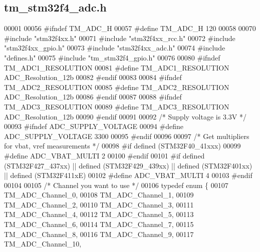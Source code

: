 \hypertarget{tm__stm32f4__adc_8h_source}{}\subsection{tm\+\_\+stm32f4\+\_\+adc.\+h}

\begin{DoxyCode}
00001 
00056 \textcolor{preprocessor}{#ifndef TM\_ADC\_H}
00057 \textcolor{preprocessor}{#define TM\_ADC\_H 120}
00058 
00070 \textcolor{preprocessor}{#include "stm32f4xx.h"}
00071 \textcolor{preprocessor}{#include "stm32f4xx\_rcc.h"}
00072 \textcolor{preprocessor}{#include "stm32f4xx\_gpio.h"}
00073 \textcolor{preprocessor}{#include "stm32f4xx\_adc.h"}
00074 \textcolor{preprocessor}{#include "defines.h"}
00075 \textcolor{preprocessor}{#include "tm\_stm32f4\_gpio.h"}
00076 
00080 \textcolor{preprocessor}{#ifndef TM\_ADC1\_RESOLUTION}
00081 \textcolor{preprocessor}{#define TM\_ADC1\_RESOLUTION      ADC\_Resolution\_12b}
00082 \textcolor{preprocessor}{#endif}
00083 
00084 \textcolor{preprocessor}{#ifndef TM\_ADC2\_RESOLUTION}
00085 \textcolor{preprocessor}{#define TM\_ADC2\_RESOLUTION      ADC\_Resolution\_12b}
00086 \textcolor{preprocessor}{#endif}
00087 
00088 \textcolor{preprocessor}{#ifndef TM\_ADC3\_RESOLUTION}
00089 \textcolor{preprocessor}{#define TM\_ADC3\_RESOLUTION      ADC\_Resolution\_12b}
00090 \textcolor{preprocessor}{#endif}
00091 
00092 \textcolor{comment}{/* Supply voltage is 3.3V */}
00093 \textcolor{preprocessor}{#ifndef ADC\_SUPPLY\_VOLTAGE}
00094 \textcolor{preprocessor}{#define ADC\_SUPPLY\_VOLTAGE      3300}
00095 \textcolor{preprocessor}{#endif}
00096 
00097 \textcolor{comment}{/* Get multipliers for vbat, vref measurements */}
00098 \textcolor{preprocessor}{#if defined (STM32F40\_41xxx)}
00099 \textcolor{preprocessor}{#define ADC\_VBAT\_MULTI          2}
00100 \textcolor{preprocessor}{#endif}
00101 \textcolor{preprocessor}{#if defined (STM32F427\_437xx) || defined (STM32F429\_439xx) || defined (STM32F401xx) || defined
       (STM32F411xE)}
00102 \textcolor{preprocessor}{#define ADC\_VBAT\_MULTI          4}
00103 \textcolor{preprocessor}{#endif}
00104 
00105 \textcolor{comment}{/* Channel you want to use */}
00106 \textcolor{keyword}{typedef} \textcolor{keyword}{enum} \{
00107     TM\_ADC\_Channel\_0,
00108     TM\_ADC\_Channel\_1,
00109     TM\_ADC\_Channel\_2,
00110     TM\_ADC\_Channel\_3,
00111     TM\_ADC\_Channel\_4,
00112     TM\_ADC\_Channel\_5,
00113     TM\_ADC\_Channel\_6,
00114     TM\_ADC\_Channel\_7,
00115     TM\_ADC\_Channel\_8,
00116     TM\_ADC\_Channel\_9,
00117     TM\_ADC\_Channel\_10,

\end{DoxyCode}
